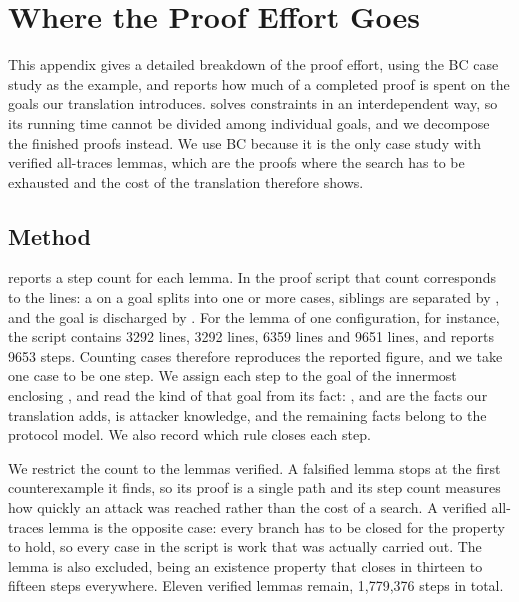 \section{Where the Proof Effort Goes}
\label{app:breakdown}

This appendix gives a detailed breakdown of the proof effort, using the BC case study as the example, 
and reports how much of a completed proof is spent on the goals our translation
introduces.
\Tamarin{} solves constraints in an interdependent way, so its running time cannot be divided
among individual goals, and we decompose the finished proofs instead.
We use BC because it is the only case study with verified all-traces lemmas, 
which are the proofs where the search has to be exhausted and the cost of the translation therefore shows.

\subsection{Method}

\Tamarin{} reports a step count for each lemma.
In the proof script that count corresponds to the  lines: a  on a goal
splits into one or more cases, 
siblings are separated by , and the goal is discharged by .
For the  lemma of one configuration, for instance, the script contains
3292  lines, 3292  lines, 6359  lines 
and 9651  lines, and \Tamarin{} reports 9653 steps.
Counting cases therefore reproduces the reported figure, and we take one case to be one step.
We assign each step to the goal of the innermost enclosing , and read the kind of that goal from its fact:
,  and  are the facts our translation adds, 
 is attacker knowledge, and the remaining facts belong to the protocol model.
We also record which rule closes each step.

We restrict the count to the lemmas \Tamarin{} verified.
A falsified lemma stops at the first counterexample it finds, so its proof is a single path and
its step count measures how quickly an attack was reached rather than the cost of a search.
A verified all-traces lemma is the opposite case: every branch has to be closed for the property to hold, 
so every case in the script is work that was actually carried out.
The  lemma is also excluded, being an existence property that closes in thirteen to fifteen steps everywhere.
Eleven verified lemmas remain, 1{,}779{,}376 steps in total.

